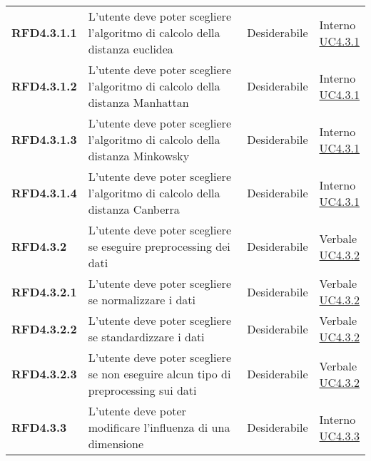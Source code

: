 \begin{longtable}[H]{>{\raggedright\bfseries}m{20mm} >{\raggedright}m{90mm} >{\raggedright}m{28mm} >{\raggedright\arraybackslash}m{30mm}}
    RFD4.3.1.1
    & L'utente deve poter scegliere l'algoritmo di calcolo della distanza euclidea
    & Desiderabile
    & \makecell{ Interno \\ \hyperref[par:uc4.3.1]{UC4.3.1} }\\

    RFD4.3.1.2
    & L'utente deve poter scegliere l'algoritmo di calcolo della distanza Manhattan
    & Desiderabile
    & \makecell{ Interno \\ \hyperref[par:uc4.3.1]{UC4.3.1} }\\

    RFD4.3.1.3
    & L'utente deve poter scegliere l'algoritmo di calcolo della distanza Minkowsky
    & Desiderabile
    & \makecell{ Interno \\ \hyperref[par:uc4.3.1]{UC4.3.1} }\\

    RFD4.3.1.4
    & L'utente deve poter scegliere l'algoritmo di calcolo della distanza Canberra
    & Desiderabile
    & \makecell{ Interno \\ \hyperref[par:uc4.3.1]{UC4.3.1} }\\

    RFD4.3.2
    & L'utente deve poter scegliere se eseguire preprocessing dei dati
    & Desiderabile
    & \makecell{ Verbale \\ \hyperref[par:uc4.3.2]{UC4.3.2} }\\

    RFD4.3.2.1
    & L'utente deve poter scegliere se normalizzare i dati
    & Desiderabile
    & \makecell{ Verbale \\ \hyperref[par:uc4.3.2]{UC4.3.2} }\\

    RFD4.3.2.2
    & L'utente deve poter scegliere se standardizzare i dati
    & Desiderabile
    & \makecell{ Verbale \\ \hyperref[par:uc4.3.2]{UC4.3.2} }\\

    RFD4.3.2.3
    & L'utente deve poter scegliere se non eseguire alcun tipo di preprocessing sui dati
    & Desiderabile
    & \makecell{ Verbale \\ \hyperref[par:uc4.3.2]{UC4.3.2} }\\


    RFD4.3.3
    & L'utente deve poter modificare l'influenza di una dimensione
    & Desiderabile
    & \makecell{ Interno \\ \hyperref[par:uc4.3.3]{UC4.3.3} }\\


\end{longtable}
